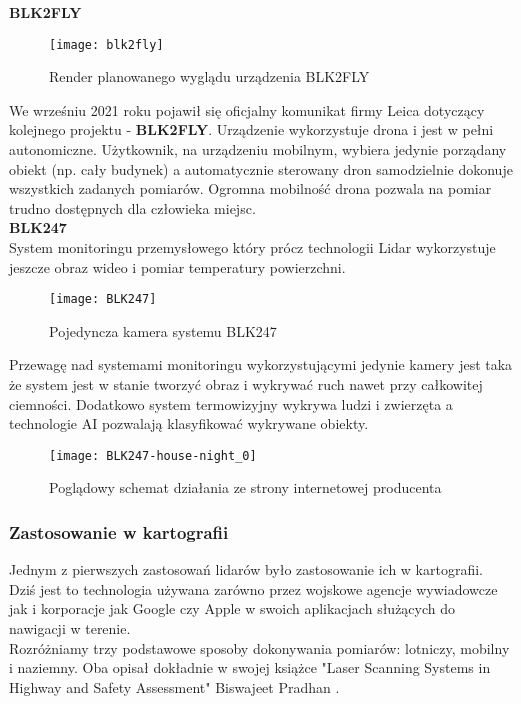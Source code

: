 \textbf{BLK2FLY}

\begin{figure}[h]
    \centering
    \texttt{[image: blk2fly]}
    \caption{Render planowanego wyglądu urządzenia BLK2FLY \cite{blk2fly}}
    \label{fig:blk2fly}
\end{figure}

We wrześniu 2021 roku pojawił się oficjalny komunikat firmy Leica dotyczący kolejnego projektu - \textbf{BLK2FLY}. Urządzenie wykorzystuje drona i jest w pełni autonomiczne. Użytkownik, na urządzeniu mobilnym, wybiera jedynie porządany obiekt (np. cały budynek) a automatycznie sterowany dron samodzielnie dokonuje wszystkich zadanych pomiarów. Ogromna mobilność drona pozwala na pomiar trudno dostępnych dla człowieka miejsc.\\

\textbf{BLK247}\\
System monitoringu przemysłowego który prócz technologii Lidar wykorzystuje jeszcze obraz wideo i pomiar temperatury powierzchni.\\
\begin{figure}[h]
    \centering
    \texttt{[image: BLK247]}
    \caption{Pojedyncza kamera systemu BLK247 \cite{blk247}}
    \label{fig:blk247}
\end{figure}
Przewagę nad systemami monitoringu wykorzystującymi jedynie kamery jest taka że system jest w stanie tworzyć obraz i wykrywać ruch nawet przy całkowitej ciemności. Dodatkowo system termowizyjny wykrywa ludzi i zwierzęta a technologie AI pozwalają klasyfikować wykrywane obiekty.

\begin{figure}[h]
    \centering
    \texttt{[image: BLK247-house-night\_0]}
    \caption{Poglądowy schemat działania ze strony internetowej producenta \cite{blk247}}
    \label{fig:house-night}
\end{figure}

\newpage
\subsubsection{Zastosowanie w kartografii}
Jednym z pierwszych zastosowań lidarów było zastosowanie ich w kartografii. Dziś jest to technologia używana zarówno przez wojskowe agencje wywiadowcze jak i korporacje jak Google czy Apple w swoich aplikacjach służących do nawigacji w terenie.\\

Rozróżniamy trzy podstawowe sposoby dokonywania pomiarów: lotniczy, mobilny i naziemny. Oba opisał dokładnie w swojej książce "Laser Scanning Systems in Highway and Safety Assessment" Biswajeet Pradhan \cite{pradhan}.\\

